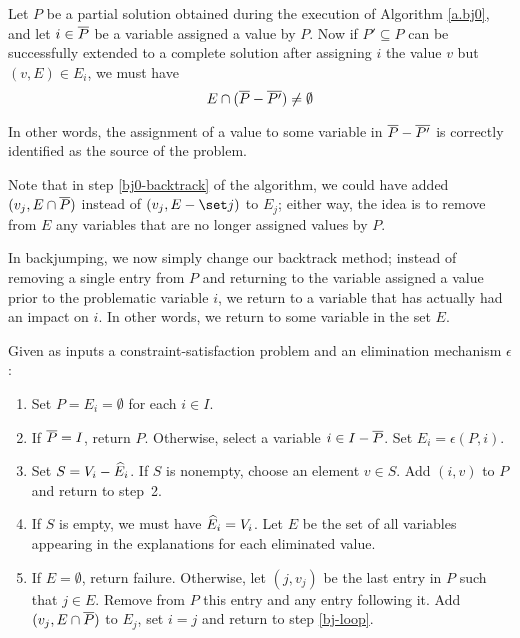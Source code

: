 \begin{lemma} Let $P$ be a partial solution obtained during the
execution of Algorithm \ref{a.bj0}, and let $i\in\overline P$ be a variable
assigned a value by $P$.  Now if $P'\subseteq P$ can be successfully
extended to a complete solution after assigning $i$ the value $v$ but
$(v,E)\in E_i$, we must have
 \[E\cap(\overline P - \overline{P'}) \neq\emptyset\]
 \label{l.bj}
 \label{old.4}
 \end{lemma}

In other words, the assignment of a value to some variable in $\overline P -
\overline{P'}$ is correctly identified as the source of the problem.

Note that in step \ref{bj0-backtrack} of the algorithm, we could have
added $(v_j,E\cap \overline P)$ instead of $(v_j,E-\set j)$ to $E_j$; either
way, the idea is to remove from $E$ any variables that are no longer
assigned values by $P$.

In backjumping, we now simply change our backtrack method; instead of
removing a single entry from $P$ and returning to the variable
assigned a value prior to the problematic variable $i$, we return to a
variable that has actually had an impact on $i$.  In other words, we
return to some variable in the set $E$.

\begin{algorithm}[Backjumping] Given as inputs a
constraint-satisfaction problem and an elimination mechanism
$\epsilon$:
 \begin{enumerate} 
 \item Set $P=E_i=\emptyset$ for each $i\in I$.
 \item If $\overline P=I$, return $P$.  Otherwise, select a variable $i\in
I-\overline P$.  Set $E_i=\epsilon(P,i).$ \label{bj-reset}
 \item Set $S=V_i-\widehat E_i$.  If $S$ is nonempty, choose an element
$v\in S$.  Add $(i,v)$ to $P$ and return to step~2.  \label{bj-loop}
 \item If $S$ is empty, we must have $\widehat E_i=V_i$.  Let $E$ be the
set of all variables appearing in the explanations for each eliminated
value.
 \item If $E=\emptyset$, return failure.  Otherwise, let $(j,v_j)$ be
the last entry in $P$ such that $j\in E$.  Remove from $P$ this entry
and any entry following it.  Add $(v_j,E\cap \overline P)$ to $E_j$, set
$i=j$ and return to step \ref{bj-loop}.  \label{bj-backtrack}
 \end{enumerate}
 \label{a.bj}
 \end{algorithm}

